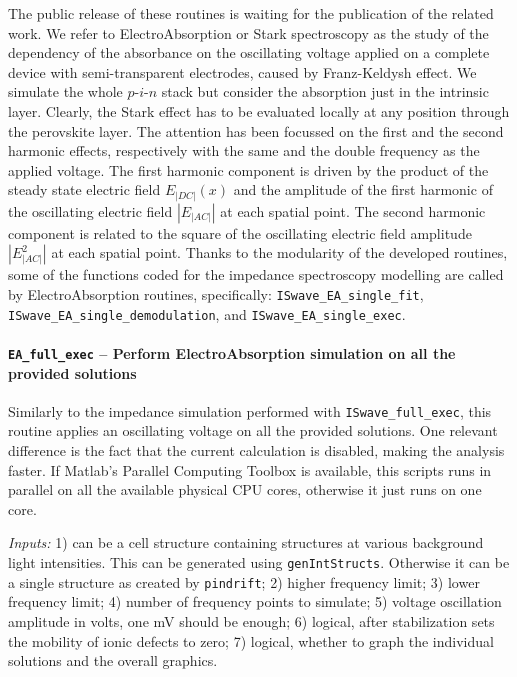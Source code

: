 The public release of these routines is waiting for the publication of the related work.
We refer to ElectroAbsorption or Stark spectroscopy as the study of the dependency of the absorbance on the oscillating voltage applied on a complete device with semi\hyp{}transparent electrodes, caused by Franz\hyp{}Keldysh effect.
We simulate the whole $p$-$i$-$n$ stack but consider the absorption just in the intrinsic layer.
Clearly, the Stark effect has to be evaluated locally at any position through the perovskite layer.
The attention has been focussed on the first and the second harmonic effects, respectively with the same and the double frequency as the applied voltage.
The first harmonic component is driven by the product of the steady state electric field $E_|DC|(x)$ and the amplitude of the first harmonic of the oscillating electric field $|E_|AC||$ at each spatial point.
The second harmonic component is related to the square of the oscillating electric field amplitude $|E_|AC|^2|$ at each spatial point.
Thanks to the modularity of the developed routines, some of the functions coded for the impedance spectroscopy modelling are called by ElectroAbsorption routines, specifically: \texttt{IS\-wave\_EA\_single\_fit}, \texttt{IS\-wave\_EA\_single\_demodulation}, and \texttt{IS\-wave\_EA\_single\_exec}.



\paragraph{\texttt{EA\_full\_exec} -- Perform ElectroAbsorption simulation on all the provided solutions}
Similarly to the impedance simulation performed with \texttt{IS\-wave\_full\_exec}, this routine applies an oscillating voltage on all the provided solutions.
One relevant difference is the fact that the current calculation is disabled, making the analysis faster.
If Matlab's Parallel Computing Toolbox is available, this scripts runs in parallel on all the available physical CPU cores, otherwise it just runs on one core.

\textit{Inputs:} 1) can be a cell structure containing structures at various background
light intensities. This can be generated using \texttt{gen\-Int\-Structs}.
Otherwise it can be a single structure as created by \texttt{pin\-drift};
2) higher frequency limit;
3) lower frequency limit;
4) number of frequency points to simulate;
5) voltage oscillation amplitude in volts, one mV should be enough;
6) logical, after stabilization sets the mobility of
ionic defects to zero;
7) logical, whether to graph the individual solutions and
the overall graphics.

